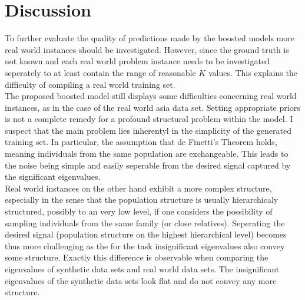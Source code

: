 \documentclass[a4paper, 11pt]{article}
\begin{document}
\section{Discussion}
To further evaluate the quality of predictions made by the boosted models more real world instances should be investigated. However, since the ground truth is not known and each real world problem instance needs to be investigated seperately to at least contain the range of reasonable $K$ values. This explains the difficulty of compiling a real world training set.\\
The proposed boosted model still displays some difficulties concerning real world instances, as in the case of the real world asia data set. Setting appropriate priors is not a complete remedy for a profound structural problem within the model. I suspect that the main problem lies inherentyl in the simplicity of the generated training set. In particular, the assumption that de Finetti's Theorem holds, meaning individuals from the same population are exchangeable. This leads to the noise being simple and easily seperable from the desired signal captured by the significant eigenvalues.\\
Real world instances on the other hand exhibit a more complex structure, especially in the sense that the population structure is usually hierarchicaly structured, possibly to an very low level, if one considers the possibility of sampling individuals from the same family (or close relatives). Seperating the desired signal (population structure on the highest hierarchical level) becomes thus more challenging as the for the task insignificant eigenvalues also convey some structure. Exactly this difference is observable when comparing the eigenvalues of synthetic data sets and real world data sets. The insignificant eigenvalues of the synthetic data sets look flat and do not convey any more structure.\\
\end{document}
